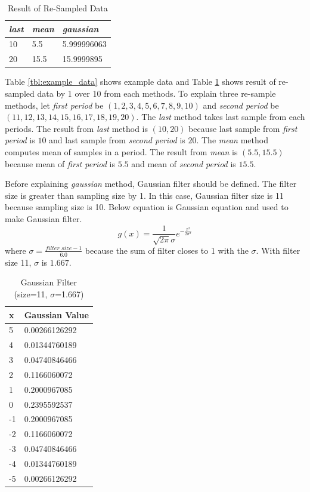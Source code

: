 \documentclass[draft,dvipsnames]{drexel-thesis}
\begin{document}
\begin{thesis}
\begin{table}[!t]
\centering
\caption{Result of Re-Sampled Data}
\label{tbl:result_resample}
\begin{tabular}{|l|l|l|}
\hline
{\em last} & {\em mean} & {\em gaussian}    \\ \hline
10   & 5.5  & 5.999996063 \\
20   & 15.5 & 15.9999895  \\ \hline
\end{tabular}
\end{table}

Table \ref{tbl:example_data} shows example data and Table \ref{tbl:result_resample} shows result of re-sampled data by 1 over 10 from each methods. To explain three re-sample methods, let {\em first period} be $(1, 2, 3, 4, 5, 6, 7, 8, 9, 10)$ and {\em second period} be $(11, 12, 13, 14, 15, 16, 17, 18, 19, 20)$. The {\em last} method takes last sample from each periods. The result from {\em last} method is $(10, 20)$ because last sample from {\em first period} is $10$ and last sample from {\em second period} is $20$. The {\em mean} method computes mean of samples in a period. The result from {\em mean} is $(5.5, 15.5)$ because mean of {\em first period} is $5.5$ and mean of {\em second period} is $15.5$.

Before explaining {\em gaussian} method, Gaussian filter should be defined. The filter size is greater than sampling size by 1. In this case, Gaussian filter size is 11 because sampling size is 10. Below equation is Gaussian equation and used to make Gaussian filter.
$$g(x) = \frac{1}{\sqrt{2\pi}\sigma}e^{-\frac{x^2}{2\sigma^2}}$$
where $\sigma = \frac{filter\_size-1}{6.0}$ because the sum of filter closes to 1 with the $\sigma$. With filter size 11, $\sigma$ is $1.667$.

\begin{table}[!t]
\centering
\caption{Gaussian Filter (size=11, $\sigma$=1.667)}
\label{tbl:gaussian_filter}
\begin{tabular}{|l|l|}
\hline
x  & Gaussian Value \\ \hline
5  & 0.00266126292  \\
4  & 0.01344760189  \\
3  & 0.04740846466  \\
2  & 0.1166060072   \\
1  & 0.2000967085   \\
0  & 0.2395592537   \\
-1 & 0.2000967085   \\
-2 & 0.1166060072   \\
-3 & 0.04740846466  \\
-4 & 0.01344760189  \\
-5 & 0.00266126292  \\ \hline
\end{tabular}
\end{table}


\end{thesis}
\end{document}

